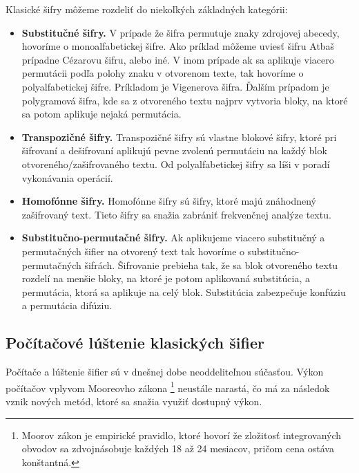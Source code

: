 Klasické šifry môžeme rozdeliť do niekoľkých základných kategórii:
\begin{itemize}

\item \textbf{Substitučné šifry.}
  V prípade že šifra permutuje znaky zdrojovej abecedy, hovoríme o monoalfabetickej šifre.
  Ako príklad môžeme uviesť šifru Atbaš prípadne Cézarovu šifru, alebo iné.
  V inom prípade ak sa aplikuje viacero permutácii podľa polohy znaku v otvorenom texte, tak hovoríme o polyalfabetickej šifre.
  Príkladom je Vigenerova šifra. Ďalším prípadom je polygramová šifra, kde sa z otvoreného textu najprv vytvoria bloky,
  na ktoré sa potom aplikuje nejaká permutácia.

\item \textbf{Transpozičné šifry.}
  Transpozičné šifry sú vlastne blokové šifry, ktoré pri šifrovaní a dešifrovaní aplikujú pevne zvolenú permutáciu na každý blok
  otvoreného/zašifrovaného textu. Od polyalfabetickej šifry sa líši v poradí vykonávania operácií.
  
\item \textbf{Homofónne šifry.}
  Homofónne šifry sú šifry, ktoré majú znáhodnený zašifrovaný text. Tieto šifry sa snažia zabrániť frekvenčnej analýze textu. 
  
\item \textbf{Substitučno-permutačné šifry.}
  Ak aplikujeme viacero substitučný a permutačných šifier na otvorený text tak hovoríme o substitučno-permutačných šifrách.
  Šifrovanie prebieha tak, že sa blok otvoreného textu rozdelí na menšie bloky, na ktoré je potom aplikovaná substitúcia, a permutácia,
  ktorá sa aplikuje na celý blok. Substitúcia zabezpečuje konfúziu a permutácia difúziu.
  
\end{itemize}

\subsection{Počítačové lúštenie klasických šifier}
Počítače a lúštenie šifier sú v dnešnej dobe neoddeliteľnou súčasťou. Výkon počítačov vplyvom Mooreovho zákona \footnote{Moorov zákon je empirické pravidlo, ktoré hovorí že zložitosť integrovaných obvodov sa zdvojnásobuje každých 18 až 24 mesiacov, pričom cena ostáva konštantná.} neustále narastá,
čo má za následok vznik nových metód, ktoré sa snažia využiť dostupný výkon.

